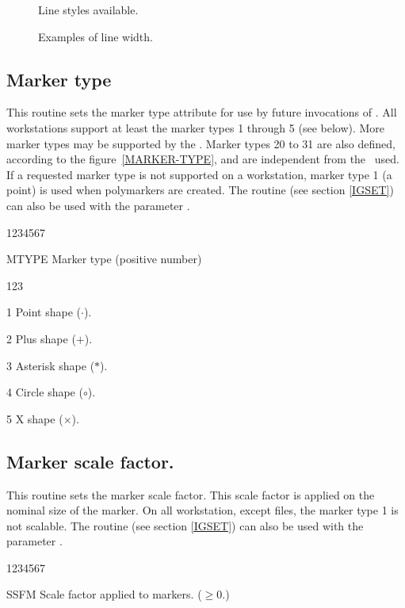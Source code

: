 \begin{figure}[p]
\begin{center}\mbox{}\end{center}
\caption{Line styles available.}
\label{LINE-TYPE}

\bigskip

\begin{center}\mbox{}\end{center}
\caption{Examples of line width.}
\label{LINE-WIDTH}
\end{figure}
\clearpage
%
\subsection{Marker type}
\Action
This routine sets the marker type attribute for use by future invocations of
. All workstations support at least the marker types 1 through 5
(see below). More marker types may be supported by the \UGP. Marker types 20 to
31 are also defined, according to the figure~\ref{MARKER-TYPE}, and are
independent from the \UGP~used. If a requested marker type is not supported on a
workstation, marker type 1 (a point) is used when polymarkers are created.
The routine  (see section \ref{IGSET}) can also be used with the
parameter .
\Pdesc
\begin{DLtt}{1234567}
\item[MTYPE] Marker type (positive number)
\begin{DLtt}{123}
\item[1] Point shape ($\cdot$).
\item[2] Plus shape ($+$).
\item[3] Asterisk shape ($\ast$).
\item[4] Circle shape ($\circ$).
\item[5] X shape ($\times$).
\end{DLtt}
\end{DLtt}
%
\subsection{Marker scale factor.}
\Action
This routine sets the marker scale factor. This scale factor is applied on
the nominal size of the marker. On all workstation, except \PS{} files, the marker
type 1 is not scalable. The routine  (see section \ref{IGSET}) can
also be used with the parameter .
\Pdesc
\begin{DLtt}{1234567}
\item[SSFM] Scale factor applied to markers. (\(\geq0.\))
\end{DLtt}

